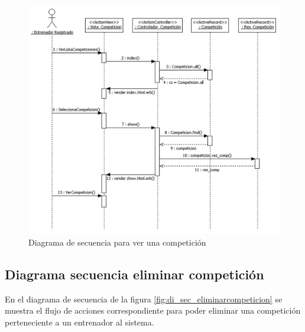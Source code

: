 		  \begin{figure}[H]
			  \centering
			    \includegraphics[width=15cm]{./eps/di_diagsecuencia/Competicion_Ver.eps}
			  \caption{Diagrama de secuencia para ver una competición}
			  \label{fig:di_sec_vercompeticion}
			\end{figure}
		
		  \newpage
		
		\subsection{Diagrama secuencia eliminar competición} %
		  \label{sub:diagrama_secuencia_eliminar_competicion}
		  
		  En el diagrama de secuencia de la figura \ref{fig:di_sec_eliminarcompeticion} se muestra el flujo de acciones correspondiente para poder eliminar una competición perteneciente a un entrenador al sistema.
		  
